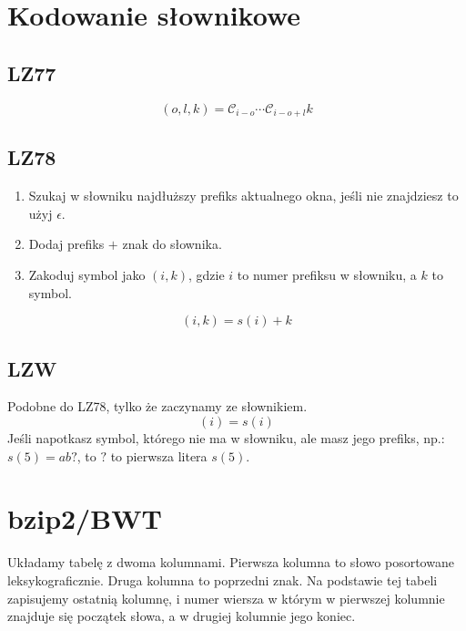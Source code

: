 \documentclass{../notatki}
\begin{document}
\begin{multicols}{2}
  \section{Kodowanie słownikowe}

  \subsection{LZ77}

  $$
  (o, l, k) = \mathcal{C}_{i - o} \cdots \mathcal{C}_{i - o + l} k
  $$

  \subsection{LZ78}

  \begin{enumerate}
    \item Szukaj w słowniku najdłuższy prefiks aktualnego okna, jeśli
      nie znajdziesz to użyj $\epsilon$.
    \item Dodaj prefiks $+$ znak do słownika.
    \item Zakoduj symbol jako $(i, k)$, gdzie $i$ to numer
      prefiksu w słowniku, a $k$ to symbol.
  \end{enumerate}

  $$
  (i, k) = s(i) + k
  $$

  \subsection{LZW}

  Podobne do LZ78, tylko że zaczynamy ze słownikiem.
  $$
  (i) = s(i)
  $$
  Jeśli napotkasz symbol, którego nie ma w słowniku, ale masz jego prefiks,
  np.: $s(5) = ab?$, to $?$ to pierwsza litera $s(5)$.

  \section{bzip2/BWT}

  Układamy tabelę z dwoma kolumnami. Pierwsza kolumna to słowo posortowane
  leksykograficznie. Druga kolumna to poprzedni znak. Na podstawie tej tabeli
  zapisujemy ostatnią kolumnę, i numer wiersza w którym w pierwszej kolumnie
  znajduje się początek słowa, a w drugiej kolumnie jego koniec.

  \begin{center}


\end{center}
\end{multicols}
\end{document}
